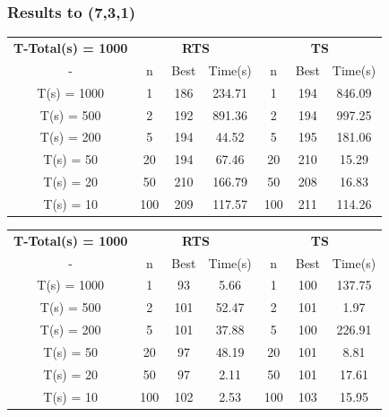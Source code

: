 \documentclass{beamer}
\begin{document}
\begin{frame}
  \frametitle{Results to (7,3,1)}
{
\tiny

\begin{table}
\begin{tabular}{c|c|c|c|c|c|c}  
\addlinespace
  \toprule
\multicolumn{7}{c}{{\bf $K_{3}(7,1) \leq 186$}} \\
 \midrule
\textbf{T-Total(s) = 1000} & \multicolumn{3}{|c}{\textbf{RTS}} & \multicolumn{3}{|c}{\textbf{TS}} \\
 \midrule 
-        & n & Best & Time(s) & n & Best & Time(s) \\
 \midrule 
T(s) = 1000 & 1  & 186    & 234.71       & 1  & 194    & 846.09      \\
T(s) = 500 & 2  & 192    & 891.36       & 2  & 194    & 997.25      \\
T(s) = 200 & 5  & 194    & 44.52       & 5  & 195    & 181.06      \\
T(s) = 50 & 20  & 194    & 67.46       & 20  & 210    & 15.29      \\
T(s) = 20 & 50  & 210    & 166.79       & 50  & 208    & 16.83      \\
T(s) = 10 & 100  & 209    & 117.57       & 100  & 211    & 114.26      \\
\bottomrule  
\end{tabular}
\label{tabela-K(731)}
\end{table}


\begin{table}
\begin{tabular}{c|c|c|c|c|c|c}  
\addlinespace
  \toprule
\multicolumn{7}{c}{{\bf $c_{3}(7,1) \leq 93$}} \\
 \midrule
\textbf{T-Total(s) = 1000} & \multicolumn{3}{|c}{\textbf{RTS}} & \multicolumn{3}{|c}{\textbf{TS}} \\
 \midrule 
-        & n & Best & Time(s) & n & Best & Time(s) \\
 \midrule 
T(s) = 1000 & 1  & 93    & 5.66       & 1  & 100    & 137.75      \\
T(s) = 500 & 2  & 101    & 52.47       & 2  & 101    & 1.97      \\
T(s) = 200 & 5  & 101    & 37.88       & 5  & 100    & 226.91      \\
T(s) = 50 & 20  & 97    & 48.19       & 20  & 101    & 8.81      \\
T(s) = 20 & 50  & 97    & 2.11       & 50  & 101    & 17.61      \\
T(s) = 10 & 100  & 102    & 2.53       & 100  & 103    & 15.95      \\
\bottomrule  
\end{tabular}
\label{tabela-c(731)}
\end{table}

}
\end{frame}
\end{document}
